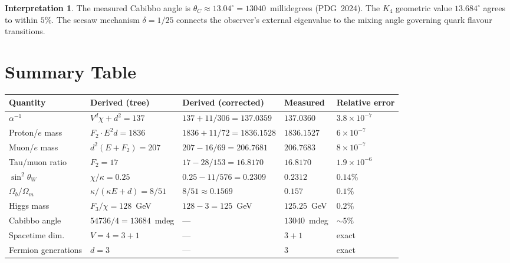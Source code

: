 \documentclass[11pt,a4paper]{article}
\theoremstyle{definition}
\newtheorem*{interpretation}{Interpretation}
\begin{document}
\begin{interpretation}
The measured Cabibbo angle is $\theta_C \approx 13.04^\circ = 13040$~millidegrees
(PDG~2024).  The $K_4$ geometric value $13.684^\circ$ agrees to within
$5\%$.  The seesaw mechanism $\delta = 1/25$ connects the observer's
external eigenvalue to the mixing angle governing quark flavour transitions.
\end{interpretation}

\section{Summary Table}
\label{sec:summary}

\begin{center}
\small
\renewcommand{\arraystretch}{1.35}
\begin{tabular}{@{}lllll@{}}
\toprule
\textbf{Quantity} & \textbf{Derived (tree)} & \textbf{Derived (corrected)} & \textbf{Measured}
  & \textbf{Relative error} \\
\midrule
$\alpha^{-1}$              & $V^d\chi + d^2 = 137$         & $137 + 11/306 = 137.0359$ & $137.0360$ & $3.8\times10^{-7}$ \\
Proton/$e$ mass            & $F_2 \cdot E^2 d = 1836$      & $1836 + 11/72 = 1836.1528$ & $1836.1527$ & $6\times10^{-7}$ \\
Muon/$e$ mass              & $d^2(E+F_2) = 207$            & $207 - 16/69 = 206.7681$ & $206.7683$ & $8\times10^{-7}$ \\
Tau/muon ratio             & $F_2 = 17$                    & $17 - 28/153 = 16.8170$ & $16.8170$ & $1.9\times10^{-6}$ \\
$\sin^2\theta_W$           & $\chi/\kappa = 0.25$          & $0.25 - 11/576 = 0.2309$ & $0.2312$ & $0.14\%$ \\
$\Omega_b/\Omega_m$        & $\kappa/(\kappa E + d) = 8/51$& $8/51 \approx 0.1569$ & $0.157$ & $0.1\%$ \\
Higgs mass                 & $F_3/\chi = 128$~GeV          & $128 - 3 = 125$~GeV     & $125.25$~GeV & $0.2\%$ \\
Cabibbo angle              & $54736/4 = 13684$~mdeg        & ---                      & $13040$~mdeg & $\sim 5\%$ \\
\midrule
Spacetime dim.             & $V = 4 = 3{+}1$               & ---                      & $3{+}1$ & exact \\
Fermion generations        & $d = 3$                       & ---                      & $3$     & exact \\

\end{tabular}
\end{center}
\end{document}
